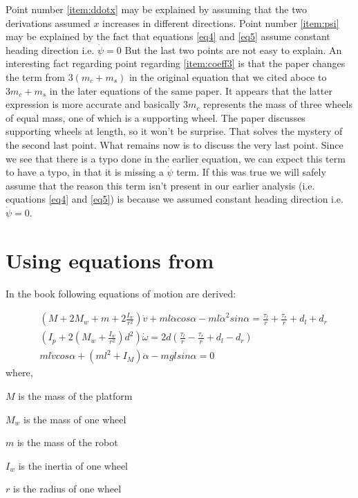\documentclass[a4paper,10pt]{article}
\begin{document}
 Point number \ref{item:ddotx} may be explained by assuming that the two derivations assumed $x$ increases in different directions.
Point number \ref{item:psi} may be explained by the fact that equations \ref{eq4} and \ref{eq5} assume constant heading direction i.e. $\dot\psi=0$
But the last two points are not easy to explain. An interesting fact regarding point regarding \ref{item:coeff3} is that the paper \cite{kim2005dynamic}
changes the term from $3(m_c+m_s)$ in the original equation that we cited aboce to $3m_c+m_s$ in the later equations of the same paper. It appears that
the latter expression is more accurate and basically $3m_c$ represents the mass of three wheels of equal mass, one of which is a supporting wheel.
The paper discusses supporting wheels at length, so it won't be surprise. That solves the mystery of the second last point. What remains now is to
discuss the very last point. Since we see that there is a typo done in the earlier equation, we can expect this term to have a typo, in that it
is missing a $\dot\psi$ term. If this was true we will safely assume that the reason this term isn't present in our earlier analysis (i.e. equations 
\ref{eq4} and \ref{eq5}) is because we assumed constant heading direction i.e. $\dot{\psi}=0$.

\section{Using equations from \cite{li2012advanced}}
In the book \cite{li2012advanced} following equations of motion are derived:

\begin{align}
 &\left(M+2M_w+m+2\frac{I_w}{r^2}\right)\dot{v}+ml\ddot{\alpha}cos\alpha-ml{\dot{\alpha}}^2sin\alpha = \frac{\tau_l}{r}+\frac{\tau_r}{r}+d_l+d_r \label{eq9} \\
 &\left(I_p+2\left(M_w+\frac{I_w}{r^2}\right)d^2\right)\dot{\omega}=2d\left(\frac{\tau_l}{r}-\frac{\tau_r}{r}+d_l-d_r\right) \label{eq10} \\
 &ml\dot{v}cos\alpha+\left(ml^2+I_M\right)\ddot{\alpha}-mglsin\alpha=0 \label{eq11}
\end{align} where,

$M$ is the mass of the platform

$M_w$ is the mass of one wheel	

$m$ is the mass of the robot

$I_w$ is the inertia of one wheel

$r$ is the radius of one wheel
\end{document}
